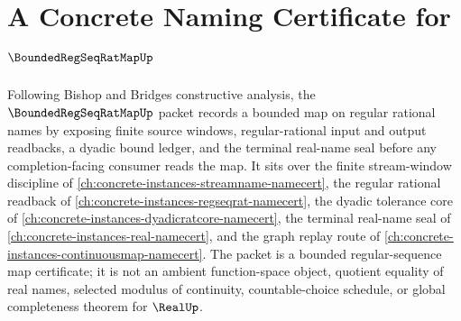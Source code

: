 \chapter{A Concrete Naming Certificate for $\BoundedRegSeqRatMapUp$}
\label{ch:concrete-instances-bounded-regseqrat-map-namecert}

Following Bishop and Bridges constructive analysis, the $\BoundedRegSeqRatMapUp$ packet records a bounded map on regular rational names by exposing finite source windows, regular-rational input and output readbacks, a dyadic bound ledger, and the terminal real-name seal before any completion-facing consumer reads the map. It sits over the finite stream-window discipline of \autoref{ch:concrete-instances-streamname-namecert}, the regular rational readback of \autoref{ch:concrete-instances-regseqrat-namecert}, the dyadic tolerance core of \autoref{ch:concrete-instances-dyadicratcore-namecert}, the terminal real-name seal of \autoref{ch:concrete-instances-real-namecert}, and the graph replay route of \autoref{ch:concrete-instances-continuousmap-namecert}. The packet is a bounded regular-sequence map certificate; it is not an ambient function-space object, quotient equality of real names, selected modulus of continuity, countable-choice schedule, or global completeness theorem for $\RealUp$.

